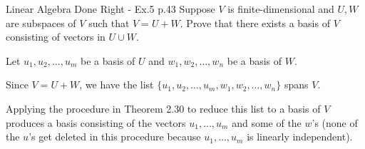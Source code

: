 \begin{problem}{}{}{Linear Algebra Done Right - Ex.5 p.43}
Suppose $V$ is finite-dimensional and $U, W$ are subspaces of $V$ such that $V = U + W$.
Prove that there exists a basis of $V$ consisting of vectors in $U \cup W$.
\end{problem}

\begin{solution}
    Let $u_1, u_2, \dots, u_m$ be a basis of $U$
    and $w_1, w_2, \dots, w_n$ be a basis of $W$.

    Since $V = U + W$, we have the list
    $\{u_1, u_2, \dots, u_m, w_1, w_2, \dots, w_n\}$ spans $V$.

    Applying the procedure in Theorem 2.30 to reduce this list to a basis of $V$
    produces a basis consisting of the vectors $u_1, \dots, u_m$
    and some of the $w$'s (none of the $u$'s get deleted in this
    procedure because $u_1, \dots, u_m$ is linearly independent).
\end{solution}
